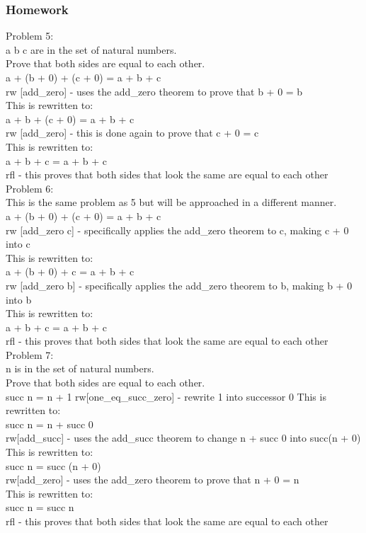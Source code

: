 \documentclass{article}
\theoremstyle{theorem}
\theoremstyle{definition}
\theoremstyle{remark}
\begin{document}
\subsubsection*{Homework}
Problem 5: \\
a b c are in the set of natural numbers. \\
Prove that both sides are equal to each other. \\
a + (b + 0) + (c + 0) = a + b + c \\
rw [add\_zero] - uses the add\_zero theorem to prove that b + 0 = b \\
This is rewritten to: \\
a + b + (c + 0) = a + b + c \\
rw [add\_zero] - this is done again to prove that c + 0 = c \\ 
This is rewritten to: \\
a + b + c = a + b + c \\
rfl - this proves that both sides that look the same are equal to each other \\

Problem 6: \\
This is the same problem as 5 but will be approached in a different manner. \\
a + (b + 0) + (c + 0) = a + b + c \\
rw [add\_zero c] - specifically applies the add\_zero theorem to c, making c + 0 into c \\
This is rewritten to: \\ 
a + (b + 0) + c = a + b + c \\
rw [add\_zero b] - specifically applies the add\_zero theorem to b, making b + 0 into b \\
This is rewritten to: \\ 
a + b + c = a + b + c \\
rfl - this proves that both sides that look the same are equal to each other \\

Problem 7: \\
n is in the set of natural numbers. \\
Prove that both sides are equal to each other. \\
succ n = n + 1
rw[one\_eq\_succ\_zero] - rewrite 1 into successor 0
This is rewritten to: \\ 
succ n = n + succ 0 \\
rw[add\_succ] - uses the add\_succ theorem to change n + succ 0 into succ(n + 0) \\
This is rewritten to: \\ 
succ n = succ (n + 0) \\
rw[add\_zero] - uses the add\_zero theorem to prove that n + 0 = n \\
This is rewritten to: \\ 
succ n = succ n \\
rfl - this proves that both sides that look the same are equal to each other \\
\end{document}
